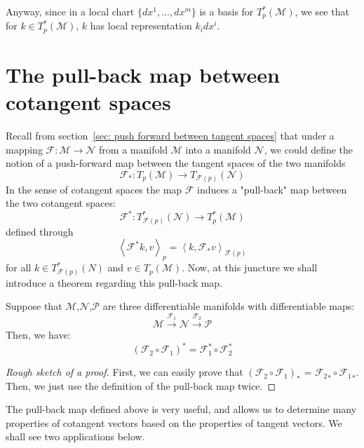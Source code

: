       Anyway, since in a local chart $\{dx^1,...,dx^m\}$ is a basis for
      $T^*_p(\mathcal{M})$, we see that for $k \in T^*_p(\mathcal{M})$, $k$
      has local representation $k_i dx^i$.
  \section{The pull-back map between cotangent spaces}
    Recall from section~\ref{sec: push forward between tangent spaces} that
    under a mapping $\mathcal{F}: \mathcal{M} \rightarrow \mathcal{N}$ from a
    manifold $\mathcal{M}$ into a manifold $\mathcal{N}$, we could define the
    notion of a push-forward map between the tangent spaces of the two
    manifolds
    \[\mathcal{F}_* : T_p(\mathcal{M}) \rightarrow
    T_{\mathcal{F}(p)}(\mathcal{N})\]
    In the sense of cotangent spaces the map $\mathcal{F}$ induces a "pull-back" map between the two cotangent spaces:
    \[\mathcal{F}^* : T^*_{\mathcal{F}(p)}(\mathcal{N}) \rightarrow
    T^*_p(\mathcal{M})\]
    defined through
    \[\left\langle \mathcal{F}^*k, v \right\rangle_p = \left\langle
    k, \mathcal{F}_*v \right\rangle_{\mathcal{F}(p)}\] for all $k \in
    T^*_{\mathcal{F}(p)}(N)$ and $v \in T_p(\mathcal{M})$. Now, at this
    juncture we shall introduce a theorem regarding this pull-back map.
    \begin{theorem}
      Suppose that $\mathcal{M}$,$\mathcal{N}$,$\mathcal{P}$ are three differentiable manifolds with differentiable maps:
      \[\mathcal{M} \xrightarrow{\mathcal{F}_1} \mathcal{N}
      \xrightarrow{\mathcal{F}_2} \mathcal{P}\]
      Then, we have:
      \[\left(\mathcal{F}_2 \circ \mathcal{F}_1\right)^* = \mathcal{F}_1^*
      \circ \mathcal{F}_2^*\]
    \end{theorem}
    \begin{proof}[Rough sketch of a proof]
      First, we can easily prove that $\left( \mathcal{F}_2 \circ
      \mathcal{F}_1\right)_*$ = ${\mathcal{F}_2}_* \circ {\mathcal{F}_1}_*$.
      Then, we just use the definition of the pull-back map twice.
    \end{proof}

    The pull-back map defined above is very useful, and allows us to determine many properties of cotangent vectors based on the properties of tangent vectors. We shall see two applications below.

